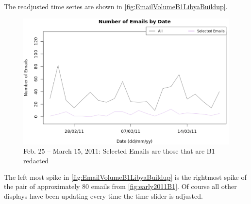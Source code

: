 \documentclass[journal]{vgtc}                %
\begin{document}
The readjusted time series are shown in \autoref{fig:EmailVolumeB1LibyaBuildup}.
\begin{figure}[h]
\begin{center}
\includegraphics[width=0.95\linewidth]{EmailVolumeB1LibyaBuildup}
\caption{Feb. 25 -- March 15, 2011:  Selected Emails are those that are B1 redacted}
\label{fig:EmailVolumeB1LibyaBuildup}
\end{center}
\end{figure}
The left most spike in \autoref{fig:EmailVolumeB1LibyaBuildup}  is the rightmost spike of the pair of approximately 80 emails from \autoref{fig:early2011B1}.   
Of course all other displays have been updating every time the time slider is adjusted.  
\end{document}
